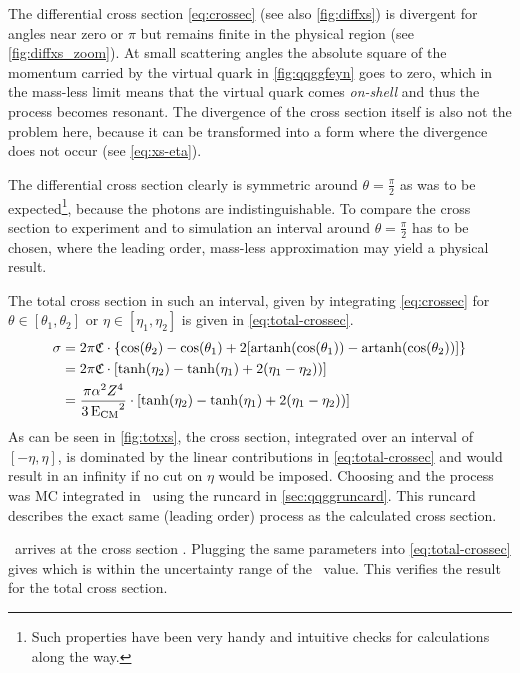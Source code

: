 %
The differential cross section \cref{eq:crossec} (see also
\cref{fig:diffxs}) is divergent for angles near zero or \(\pi\) but
remains finite in the physical region (see \cref{fig:diffxs_zoom}). At
small scattering angles the absolute square of the momentum carried by
the virtual quark in \cref{fig:qqggfeyn} goes to zero, which in the
mass-less limit means that the virtual quark comes \emph{on-shell} and
thus the process becomes resonant. The divergence of the cross section
itself is also not the problem here, because it can be transformed
into a form where the divergence does not occur (see
\cref{eq:xs-eta}).

The differential cross section clearly is symmetric around
\(\theta=\frac{\pi}{2}\) as was to be expected\footnote{Such
  properties have been very handy and intuitive checks for
  calculations along the way.}, because the photons are
indistinguishable. To compare the cross section to experiment and to
simulation an interval around \(\theta=\frac{\pi}{2}\) has to be
chosen, where the leading order, mass-less approximation may yield a
physical result.

The total cross section in such an interval, given by
integrating \cref{eq:crossec} for \(\theta\in [\theta_1, \theta_2]\)
or \(\eta\in [\eta_1, \eta_2]\) is given
in \cref{eq:total-crossec}.
%
\begin{equation}
  \label{eq:total-crossec}
  \begin{split}
  \sigma &=
  2\pi\mathfrak{C}\cdot\qty{\cos(\theta_2)-\cos(\theta_1)+2\qty[\operatorname{artanh}(\cos(\theta_1))
    - \operatorname{artanh}(\cos(\theta_2))]} \\
  &=2\pi\mathfrak{C}\cdot\qty[\tanh(\eta_2) - \tanh(\eta_1) + 2(\eta_1
  - \eta_2))] \\
  &={\frac{\pi\alpha^2Z^4}{3\operatorname{E_{\text{CM}}}^2}}\cdot\qty[\tanh(\eta_2) - \tanh(\eta_1) + 2(\eta_1
  - \eta_2))]
  \end{split}
\end{equation}
%
As can be seen in \cref{fig:totxs}, the cross section, integrated over
an interval of \([-\eta, \eta]\), is dominated by the linear
contributions in \cref{eq:total-crossec} and would result in an
infinity if no cut on \(\eta\) would be imposed. Choosing
 and  the
process was MC integrated in \sherpa\ using the runcard in
\cref{sec:qqggruncard}. This runcard describes the exact same (leading
order) process as the calculated cross section.

\sherpa\ arrives at the cross section
. Plugging the same parameters into
\cref{eq:total-crossec} gives  which is within
the uncertainty range of the \sherpa\ value. This verifies the result
for the total cross section.

